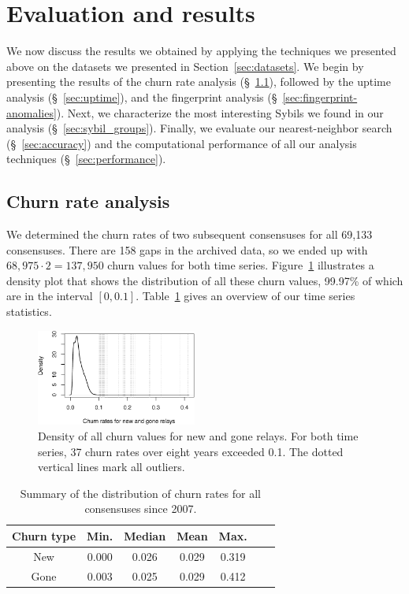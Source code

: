 \section{Evaluation and results}
\label{sec:results}
We now discuss the results we obtained by applying the techniques we presented
above on the datasets we presented in Section~\ref{sec:datasets}.  We begin by
presenting the results of the churn rate analysis (\S~\ref{sec:churn}), followed
by the uptime analysis (\S~\ref{sec:uptime}), and the fingerprint analysis
(\S~\ref{sec:fingerprint-anomalies}).  Next, we characterize the most
interesting Sybils we found in our analysis (\S~\ref{sec:sybil_groups}).
Finally, we evaluate our nearest-neighbor search (\S~\ref{sec:accuracy}) and the
computational performance of all our analysis techniques
(\S~\ref{sec:performance}).


\subsection{Churn rate analysis}
\label{sec:churn}
We determined the churn rates of two subsequent consensuses for all 69,133
consensuses.  There are 158 gaps in the archived data, so we ended up with
$68,975 \cdot 2 = 137,950$ churn values for both time series.
Figure~\ref{fig:churn-density} illustrates a density plot that shows the
distribution of all these churn values, 99.97\% of which are in the interval
$[0, 0.1]$.  Table~\ref{tab:churn-dist} gives an overview of our time series
statistics.

\begin{figure}[t]
	\centering
	\includegraphics[width=0.47\textwidth]{diagrams/churn-density.pdf}
	\caption{Density of all churn values for new and gone relays.  For both
	time series, 37 churn rates over eight years exceeded 0.1.  The dotted
	vertical lines mark all outliers.}
	\label{fig:churn-density}
\end{figure}

\begin{table}[t]
	\centering
	\begin{tabular}{ccccccc}
	\textbf{Churn type} & \textbf{Min.} & \textbf{Median} & \textbf{Mean} & \textbf{Max.} \\
	\hline
	New & 0.000 & 0.026 & 0.029 & 0.319 \\
	Gone & 0.003 & 0.025 & 0.029 & 0.412 \\
	\end{tabular}
	\caption{Summary of the distribution of churn rates for all consensuses
	since 2007.}
	\label{tab:churn-dist}
\end{table}

